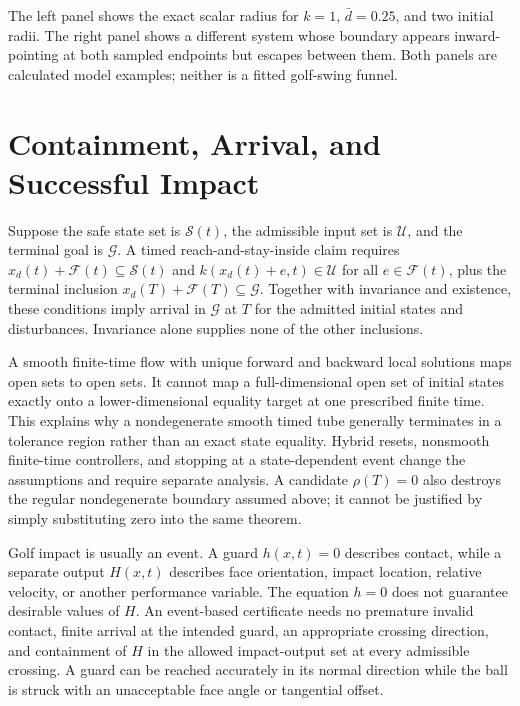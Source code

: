 The left panel shows the exact scalar radius for $k=1$, $\bar d=0.25$, and two initial radii. The right panel shows a different system whose boundary appears inward-pointing at both sampled endpoints but escapes between them. Both panels are calculated model examples; neither is a fitted golf-swing funnel.

\section{Containment, Arrival, and Successful Impact}

Suppose the safe state set is $\mathcal S(t)$, the admissible input set is $\mathcal U$, and the terminal goal is $\mathcal G$. A timed reach-and-stay-inside claim requires $x_d(t)+\mathcal F(t)\subseteq\mathcal S(t)$ and $k(x_d(t)+e,t)\in\mathcal U$ for all $e\in\mathcal F(t)$, plus the terminal inclusion $x_d(T)+\mathcal F(T)\subseteq\mathcal G$. Together with invariance and existence, these conditions imply arrival in $\mathcal G$ at $T$ for the admitted initial states and disturbances. Invariance alone supplies none of the other inclusions.

A smooth finite-time flow with unique forward and backward local solutions maps open sets to open sets. It cannot map a full-dimensional open set of initial states exactly onto a lower-dimensional equality target at one prescribed finite time. This explains why a nondegenerate smooth timed tube generally terminates in a tolerance region rather than an exact state equality. Hybrid resets, nonsmooth finite-time controllers, and stopping at a state-dependent event change the assumptions and require separate analysis. A candidate $\rho(T)=0$ also destroys the regular nondegenerate boundary assumed above; it cannot be justified by simply substituting zero into the same theorem.

Golf impact is usually an event. A guard $h(x,t)=0$ describes contact, while a separate output $H(x,t)$ describes face orientation, impact location, relative velocity, or another performance variable. The equation $h=0$ does not guarantee desirable values of $H$. An event-based certificate needs no premature invalid contact, finite arrival at the intended guard, an appropriate crossing direction, and containment of $H$ in the allowed impact-output set at every admissible crossing. A guard can be reached accurately in its normal direction while the ball is struck with an unacceptable face angle or tangential offset.

